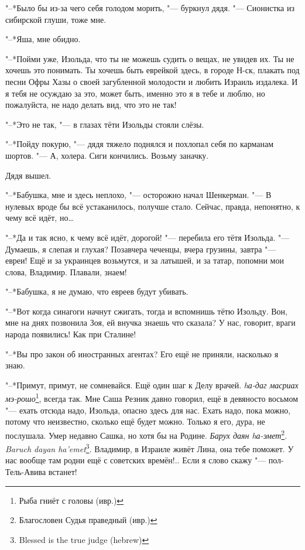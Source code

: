 "--*Было бы из-за чего себя голодом морить, "--- буркнул дядя.
"--- Сионистка из сибирской глуши, тоже мне.

"--*Яша, мне обидно.

"--*Пойми уже, Изольда, что ты не можешь судить о вещах, не увидев их.
Ты не хочешь это понимать.
Ты хочешь быть еврейкой здесь, в городе Н-ск, плакать под песни Офры Хазы о своей загубленной молодости и любить Израиль издалека.
И я тебя не осуждаю за это, может быть, именно это я в тебе и люблю, но пожалуйста, не надо делать вид, что это не так!

"--*Это не так, "--- в глазах тёти Изольды стояли слёзы.

"--*Пойду покурю, "--- дядя тяжело поднялся и похлопал себя по карманам шортов.
"--- А, холера.
Сиги кончились.
Возьму заначку.

Дядя вышел.

"--*Бабушка, мне и здесь неплохо, "--- осторожно начал Шенкерман.
"--- В нулевых вроде бы всё устаканилось, получше стало.
Сейчас, правда, непонятно, к чему всё идёт, но\ldots{}

"--*Да и так ясно, к чему всё идёт, дорогой! "--- перебила его тётя Изольда.
"--- Думаешь, я слепая и глухая?
Позавчера чеченцы, вчера грузины, завтра "--- евреи!
Ещё и за украинцев возьмутся, и за латышей, и за татар, попомни мои слова, Владимир.
Плавали, знаем!

"--*Бабушка, я не думаю, что евреев будут убивать.

"--*Вот когда синагоги начнут сжигать, тогда и вспомнишь тётю Изольду.
Вон, мне на днях позвонила Зоя, ей внучка знаешь что сказала?
У нас, говорит, враги народа появились!
Как при Сталине!

"--*Вы про закон об иностранных агентах?
Его ещё не приняли, насколько я знаю.

"--*Примут, примут, не сомневайся.
Ещё один шаг к Делу врачей.
\textit{hа-даг масриах мэ-рошо}\footnote{Рыба гниёт с головы (ивр.)}, всегда так.
Мне Саша Резник давно говорил, ещё в девяносто восьмом "--- ехать отсюда надо, Изольда, опасно здесь для нас.
Ехать надо, пока можно, потому что неизвестно, сколько ещё будет можно.
Только я его, дура, не послушала.
Умер недавно Сашка, но хотя бы на Родине.
{\textit{Барух даян hа-эмет}\footnote{Благословен Судья праведный (ивр.)}.}
{\textit{Baruch dayan ha'emet}\footnote{Blessed is the true judge (hebrew)}.}
Владимир, в Израиле живёт Лина, она тебе поможет.
У нас вообще там родни ещё с советских времён!..
Если я слово скажу "--- пол-Тель-Авива встанет!

